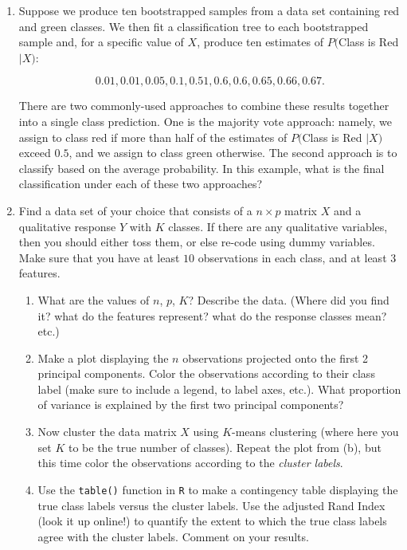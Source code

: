\documentclass[12pt]{article}
\begin{document}
\begin{enumerate}


\item Suppose we produce ten bootstrapped samples from a data set
containing red and green classes. We then fit a classification tree
to each bootstrapped sample and, for a specific value of $X$, produce
ten estimates of $P($Class is Red $ \mid X)$:

$$0.01, 0.01, 0.05, 0.1, 0.51, 0.6, 0.6, 0.65, 0.66, 0.67.$$

There are two commonly-used approaches to combine these results together into a
single class prediction. One is the majority vote approach: namely, 
 we assign to class red if more than half of the 
 estimates of $P($Class is Red $ \mid X)$ exceed $0.5$, and we assign to class green
 otherwise. The second approach is to classify based on the average
probability. In this example, what is the final classification under each
of these two approaches? 

\item Find a data set of your choice that consists of a $n \times p$ matrix $X$ and a qualitative response $Y$ with $K$ classes. 
If there are any qualitative variables, then you should either toss them, or else re-code using dummy variables. 
Make sure that you have at least $10$ observations in each class, and at least 3 features. 
\begin{enumerate}
\item What are the values of $n$, $p$, $K$? Describe the data. (Where did you find it? what do the features represent? what do the response classes mean? etc.)
\item Make a plot displaying the $n$ observations projected onto the first 2 principal components. Color the observations according to their class label (make sure to include a legend, to label axes, etc.). What proportion of variance is explained by the first two principal components?
\item Now cluster the data matrix $X$ using $K$-means clustering (where here you set $K$ to be the true number of classes). Repeat the plot from (b), but this time color the observations according to the \emph{cluster labels}.
\item Use the \verb=table()= function in \verb=R= to make a contingency table displaying the true class labels versus the cluster labels. Use the adjusted Rand Index (look it up online!) to quantify the extent to which the true class labels agree with the cluster labels. Comment on your results. 
\end{enumerate}


\end{enumerate}
\end{document}
